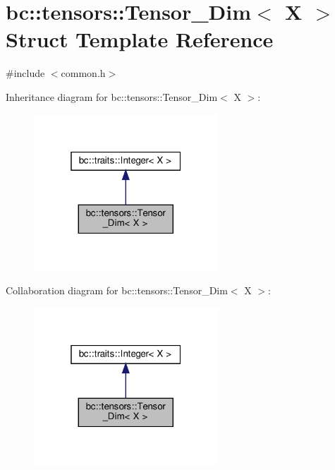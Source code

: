\hypertarget{structbc_1_1tensors_1_1Tensor__Dim}{}\section{bc\+:\+:tensors\+:\+:Tensor\+\_\+\+Dim$<$ X $>$ Struct Template Reference}
\label{structbc_1_1tensors_1_1Tensor__Dim}


{\ttfamily \#include $<$common.\+h$>$}



Inheritance diagram for bc\+:\+:tensors\+:\+:Tensor\+\_\+\+Dim$<$ X $>$\+:\nopagebreak
\begin{figure}[H]
\begin{center}
\leavevmode
\includegraphics[width=196pt]{structbc_1_1tensors_1_1Tensor__Dim__inherit__graph}
\end{center}
\end{figure}


Collaboration diagram for bc\+:\+:tensors\+:\+:Tensor\+\_\+\+Dim$<$ X $>$\+:\nopagebreak
\begin{figure}[H]
\begin{center}
\leavevmode
\includegraphics[width=196pt]{structbc_1_1tensors_1_1Tensor__Dim__coll__graph}
\end{center}
\end{figure}
